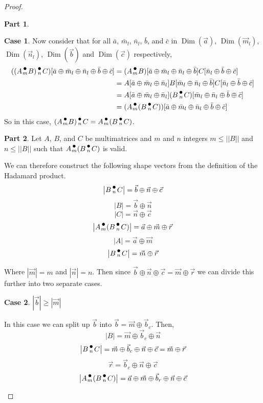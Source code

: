 \documentclass[12pt]{book}
\theoremstyle{plain}
\theoremstyle{definition}
\theoremstyle{ppart}
\newtheorem{ppart}{Part}
\theoremstyle{case}
\newtheorem{case}{Case}
\theoremstyle{solution}
\DeclareMathOperator{\Dim}{Dim}
\newcommand{\dmult}[1]{\text{\raisebox{1ex}{$\underset{#1}{\,\bullet\,}$}}}
\newcommand{\shape}[1]{\left|#1\right|}
\begin{document}
\begin{proof}
\begin{ppart}
\begin{case}
Now consider that for all $\bar{a}$, $\bar{m}_l$, $\bar{n}_l$, $\bar{b}$, and $\bar{c}$ in
$\Dim(\vec{a})$, $\Dim(\vec{m}_l)$, $\Dim(\vec{n}_l)$, $\Dim(\vec{b})$ and $\Dim(\vec{c})$ respectively,
\begin{align*}
  ((A \dmult{m} B) \dmult{n} C)[\bar{a} \oplus \bar{m}_l \oplus \bar{n}_l \oplus \bar{b} \oplus \bar{c}]
  &=
  (A \dmult{m} B)[\bar{a} \oplus \bar{m}_l \oplus \bar{n}_l \oplus \bar{b}] C[\bar{n}_l \oplus \bar{b} \oplus \bar{c}] \\
  &=
  A[\bar{a} \oplus \bar{m}_l \oplus \bar{n}_l] B[\bar{m}_l \oplus \bar{n}_l \oplus \bar{b}] C[\bar{n}_l \oplus \bar{b} \oplus \bar{c}] \\
  &=
  A[\bar{a} \oplus \bar{m}_l \oplus \bar{n}_l] (B \dmult{n} C)[\bar{m}_l \oplus \bar{n}_l \oplus \bar{b} \oplus \bar{c}] \\
  &=
  (A \dmult{m} (B \dmult{n} C))[\bar{a} \oplus \bar{m}_l \oplus \bar{n}_l \oplus \bar{b} \oplus \bar{c}]
\end{align*}
So in this case, $(A \dmult{m} B) \dmult{n} C = A \dmult{m} (B \dmult{n} C)$.
\end{case}
\end{ppart}
\begin{ppart}
Let $A$, $B$, and $C$ be multimatrices and $m$ and $n$ integers
$m \le \shape{\shape{B}}$ and $n \le \shape{\shape{B}}$ such that
$A \dmult{m} (B \dmult{n} C)$ is valid.

We can therefore construct the following shape vectors from the definition of the Hadamard product.
\[ \shape{B \dmult{n} C} =  \vec{b} \oplus \vec{n} \oplus \vec{c} \]
\[ \shape{B} =  \vec{b} \oplus \vec{n} \]
\[ \shape{C} =  \vec{n} \oplus \vec{c} \]
\[ \shape{A \dmult{m} (B \dmult{n} C)} =  \vec{a} \oplus \vec{m} \oplus \vec{r} \]
\[ \shape{A} =  \vec{a} \oplus \vec{m} \]
\[ \shape{B \dmult{n} C} =  \vec{m} \oplus \vec{r} \]

Where $\shape{\vec{m}} = m$ and $\shape{\vec{n}} = n$. 
Then since $\vec{b} \oplus \vec{n} \oplus \vec{c} = \vec{m} \oplus \vec{r}$ we can divide this further into two
separate cases.

\setcounter{case}{0}
\begin{case} $\shape{\vec{b}} \ge \shape{\vec{m}}$

In this case we can split up $\vec{b}$ into $\vec{b} = \vec{m} \oplus \vec{b}_c$. Then,
\[ \shape{B} = \vec{m} \oplus \vec{b}_c \oplus \vec{n} \]
\[ \shape{B \dmult{n} C} = \vec{m} \oplus \vec{b}_c \oplus \vec{n} \oplus \vec{c} = \vec{m} \oplus \vec{r} \]
\[ \vec{r} = \vec{b}_c \oplus \vec{n} \oplus \vec{c} \]
\[ \shape{A \dmult{m} (B \dmult{n} C)} = \vec{a} \oplus \vec{m} \oplus \vec{b}_r \oplus \vec{n} \oplus \vec{c} \]


\end{case}
\end{ppart}
\end{proof}
\end{document}
